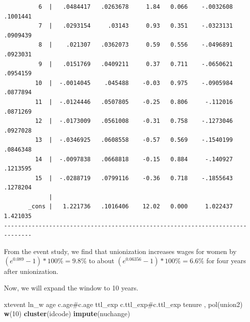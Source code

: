 \documentclass[
]{book}
\newenvironment{Shaded}{\begin{snugshade}}{\end{snugshade}}
\newcommand{\FunctionTok}[1]{\textcolor[rgb]{0.13,0.29,0.53}{\textbf{#1}}}
\newcommand{\KeywordTok}[1]{\textcolor[rgb]{0.13,0.29,0.53}{\textbf{#1}}}
\newcommand{\NormalTok}[1]{#1}
\begin{document}
\begin{verbatim}
          6  |   .0484417   .0263678     1.84   0.066    -.0032608    .1001441
          7  |   .0293154     .03143     0.93   0.351    -.0323131    .0909439
          8  |    .021307   .0362073     0.59   0.556    -.0496891    .0923031
          9  |   .0151769   .0409211     0.37   0.711    -.0650621    .0954159
         10  |  -.0014045    .045488    -0.03   0.975    -.0905984    .0877894
         11  |  -.0124446   .0507805    -0.25   0.806     -.112016    .0871269
         12  |  -.0173009   .0561008    -0.31   0.758    -.1273046    .0927028
         13  |  -.0346925   .0608558    -0.57   0.569    -.1540199    .0846348
         14  |  -.0097838   .0668818    -0.15   0.884     -.140927    .1213595
         15  |  -.0288719   .0799116    -0.36   0.718    -.1855643    .1278204
             |
       _cons |   1.221736   .1016406    12.02   0.000     1.022437    1.421035
------------------------------------------------------------------------------
\end{verbatim}

From the event study, we find that unionization increases wages for women by \((e^{0.089}-1)*100\% = 9.8\%\) to about \((e^{0.06356}-1)*100\% = 6.6\%\) for four years after unionization.

Now, we will expand the window to 10 years.

\begin{Shaded}
\begin{Highlighting}[]
\NormalTok{xtevent ln\_w age c.age\#c.age ttl\_exp c.ttl\_exp\#c.ttl\_exp tenure , pol(union2) }\FunctionTok{w}\NormalTok{(10) }\KeywordTok{cluster}\NormalTok{(idcode) }\KeywordTok{impute}\NormalTok{(nuchange)}
\end{Highlighting}
\end{Shaded}
\end{document}
